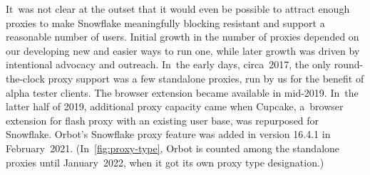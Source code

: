 \documentclass[letterpaper,twocolumn]{article}
\begin{document}
It~was not clear at the outset
that it would even be possible to attract
enough proxies to make Snowflake meaningfully blocking resistant
and support a reasonable number of users.
Initial growth in the number of proxies
depended on our developing new and easier ways to run one,
while later growth was driven by intentional advocacy and outreach.
In~the early days, circa~2017,
the only round-the-clock proxy support was
a few standalone proxies,
run by us for the benefit of alpha tester clients.
The browser extension became available in mid-2019.
In~the latter half of 2019,
additional proxy capacity came when Cupcake,
a~browser extension for flash proxy with an existing user base,
was repurposed for Snowflake.
Orbot's Snowflake proxy feature was added in version 16.4.1 in February~2021.
(In~\autoref{fig:proxy-type}, Orbot is counted among the standalone proxies
until January~2022, when it got its own proxy type designation.)
\end{document}
